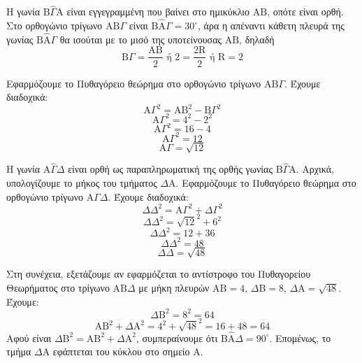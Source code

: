 \begin{alist}
    \item[α)]
    \begin{rlist}
        \item[i.] Η γωνία $\text{B}\hat{\Gamma}\text{A}$ είναι εγγεγραμμένη που βαίνει στο ημικύκλιο $\text{AB}$, οπότε είναι ορθή.
        Στο ορθογώνιο τρίγωνο $\text{AB}\Gamma$ είναι $\text{B}\hat{\text{A}}\Gamma = 30^\circ$, άρα η απέναντι κάθετη πλευρά της γωνίας $\text{B}\hat{\text{A}}\Gamma$ θα ισούται με το μισό της υποτείνουσας $\text{AB}$, δηλαδή
        \[ \text{B}\Gamma = \frac{\text{AB}}{2} \text{ ή } 2 = \frac{2\text{R}}{2} \text{ ή } \text{R} = 2 \]

        \item[ii.] Εφαρμόζουμε το Πυθαγόρειο θεώρημα στο ορθογώνιο τρίγωνο $\text{AB}\Gamma$. Έχουμε διαδοχικά:
        \[ \text{A}\Gamma^2 = \text{AB}^2 - \text{B}\Gamma^2 \]
        \[ \text{A}\Gamma^2 = 4^2 - 2^2 \]
        \[ \text{A}\Gamma^2 = 16 - 4 \]
        \[ \text{A}\Gamma^2 = 12 \]
        \[ \text{A}\Gamma = \sqrt{12} \]
    \end{rlist}

    \item[β)] Η γωνία $\text{A}\hat{\Gamma}\Delta$ είναι ορθή ως παραπληρωματική της ορθής γωνίας $\text{B}\hat{\Gamma}\text{A}$. Αρχικά, υπολογίζουμε το μήκος του τμήματος $\Delta\text{A}$. Εφαρμόζουμε το Πυθαγόρειο θεώρημα στο ορθογώνιο τρίγωνο $\text{A}\Gamma\Delta$. Έχουμε διαδοχικά:
    \[ \Delta\Delta^2 = \text{A}\Gamma^2 + \Delta\Gamma^2 \]
    \[ \Delta\Delta^2 = \sqrt{12}^2 + 6^2 \]
    \[ \Delta\Delta^2 = 12 + 36 \]
    \[ \Delta\Delta^2 = 48 \]
    \[ \Delta\Delta = \sqrt{48} \]

    Στη συνέχεια, εξετάζουμε αν εφαρμόζεται το αντίστροφο του Πυθαγορείου Θεωρήματος στο τρίγωνο $\text{AB}\Delta$ με μήκη πλευρών $\text{AB} = 4$, $\Delta\text{B} = 8$, $\Delta\text{A} = \sqrt{48}$.
    Έχουμε:
    \[ \Delta\text{B}^2 = 8^2 = 64 \]
    \[ \text{AB}^2 + \Delta\text{A}^2 = 4^2 + \sqrt{48}^2 = 16 + 48 = 64 \]
    Αφού είναι $\Delta\text{B}^2 = \text{AB}^2 + \Delta\text{A}^2$, συμπεραίνουμε ότι $\text{B}\hat{\text{A}}\Delta = 90^\circ$. Επομένως, το τμήμα $\Delta\text{A}$ εφάπτεται του κύκλου στο σημείο $\text{A}$.
\end{alist}